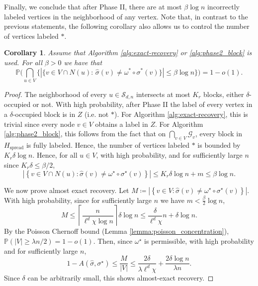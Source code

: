 \documentclass[11pt, a4paper]{amsart}
\newtheorem{corollary}[theorem]{Corollary}
\renewcommand{\P}{\mathbb{P}}
\newcommand{\1}{\mathbf{1}}
\theoremstyle{definition}
\theoremstyle{remark}
\theoremstyle{definition}
\begin{document}
Finally, we conclude that after Phase II, there are at most $\beta \log n$ incorrectly labeled vertices in the neighborhood of any vertex. Note that, in contrast to the previous statements, the following corollary also allows us to control the number of vertices labeled $*$. 
\begin{corollary}
\label{cor:abs_almost_exact}
Assume that Algorithm \ref{alg:exact-recovery} or \ref{alg:phase2_block} is used. 
    For all $\beta>0$ we have that
    $$
    \P\Big(\bigcap_{u \in V} \{|\{v \in V \cap N(u):\, \hat \sigma(v) \neq \omega^* \circ \sigma^*(v)\}|\le \beta \log n\}\Big)=1-o(1).
    $$
\end{corollary}

\begin{proof}
    The neighborhood of every $u \in \mathcal S_{d,n}$ intersects at most $K_r$ blocks, either $\delta$-occupied or not. With high probability, after Phase II the label of every vertex in a $\delta$-occupied block is in $Z$ (i.e. not $*$). For Algorithm \ref{alg:exact-recovery}, this is trivial since every node $v \in V$ obtains a label in $Z$. For Algorithm \ref{alg:phase2_block}, this follows from the fact that on $\bigcap_{v \in V} \mathcal G_v$, every block in $H_{\mathrm{spread}}$ is fully labeled. Hence, the number of vertices labeled $*$ is bounded by $K_r \delta \log n$. Hence, for all $u \in  V$, with high probability, and for sufficiently large $n$ since $K_r\delta \leq \beta/2$,
\begin{equation}
    \left| \left\{ v\in V \cap N(u): \widehat\sigma(v) \neq \omega^\star\circ\sigma^\star(v) \right\} \right|  \leq K_r\delta \log n + m \leq \beta \log n.
\end{equation}

We now prove almost exact recovery. Let $ M \coloneqq |\left\{
        v\in V:
        \widehat\sigma(v)
        \neq
        \omega^\star\circ\sigma^\star(v)
    \right\}|$.
With high probability, since  for sufficiently large $n$ we have $m<\frac{\beta}{2} \log n$,
\begin{equation}
     M\leq \left\lceil\frac{n}{\ell^d\chi\log n}\right\rceil \delta\log n\leq
    \frac{\delta}{\ell^d\chi}n+\delta\log n.
\end{equation}
By the Poisson Chernoff bound (Lemma \ref{lemma:poisson_concentration}),  $\mathbb P\left(| V|\geq\lambda n/{2}\right)=1-o(1)$.
Then, since $\omega^\star$ is permissible, with high probability and for sufficiently large $n$,
\begin{equation}
    1-A(\widehat\sigma,\sigma^\star)
    \leq \frac{M}{|V|}
     \leq
    \frac{2\delta}{\lambda \ell^d\chi}
    +\frac{2\delta\log n}{\lambda n}.
\end{equation}
Since $\delta$ can be arbitrarily small, this shows almost-exact recovery.
\end{proof}
\end{document}
